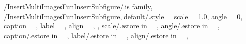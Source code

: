 {
} %

\pgfkeys
{
  /InsertMultiImagesFunInsertSubfigure/.is family, /InsertMultiImagesFunInsertSubfigure,
  default/.style = 
  {
    scale = 1.0,
    angle = 0,
    caption = \empty,
    label = \empty,
    align = \empty,
  },
  scale/.estore in = \InsertMultiImagesFunInsertSubfigureValueScale,
  angle/.estore in = \InsertMultiImagesFunInsertSubfigureValueAngle,
  caption/.estore in = \InsertMultiImagesFunInsertSubfigureValueCaption,
  label/.estore in = \InsertMultiImagesFunInsertSubfigureValueLabel,
  align/.estore in = \InsertMultiImagesFunInsertSubfigureValueAlign,
} %

\newcommand{\InsertMultiImagesFunInsertSubfigure}[2][\empty]
{
  \SetWidthOfImagePerRow
  \pgfkeys{/InsertMultiImagesFunInsertSubfigure, default, #1}
  \begin{subfigure}[b]{\WidthOfImagePerRow\textwidth}
    \center
    \includegraphics[
      scale=\InsertMultiImagesFunInsertSubfigureValueScale,
      angle=\InsertMultiImagesFunInsertSubfigureValueAngle]
      {#2}
    \SetImageCaption{\InsertMultiImagesFunInsertSubfigureValueCaption}
    \ifthenelse{\equal{
      \InsertMultiImagesFunInsertSubfigureValueCaption}{\empty}}
      {}{\SetImageLabel{\InsertMultiImagesFunInsertSubfigureValueLabel}}
  \end{subfigure}%
} %

